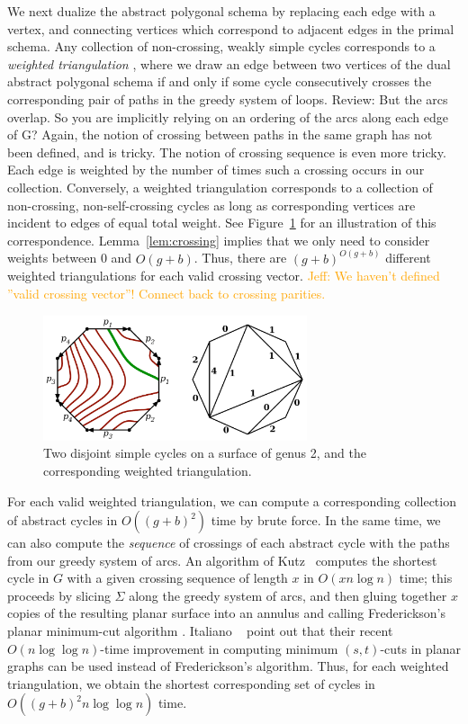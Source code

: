 \documentclass[letterpaper,review]{siamart190516}
\def\rnote#1{\color{red}Review: #1 \color{black}}
\def\jnote#1{\textcolor{orange}{Jeff: #1}}
\begin{document}
We next dualize the abstract polygonal schema by replacing each edge with a vertex, and connecting vertices which correspond to adjacent edges in the primal schema.  Any collection of non-crossing, weakly simple cycles corresponds to a \emph{weighted triangulation} \cite{ccelw-scsih-08}, where we draw an edge between two vertices of the dual abstract polygonal schema if and only if some cycle consecutively crosses the corresponding pair of paths in the greedy system of loops.  
\rnote{
But the arcs overlap. So you are implicitly relying on an ordering of the arcs along each edge of G? Again, the notion of crossing between paths in the same graph has not been defined, and is tricky. The notion of crossing sequence is even more tricky.
}
Each edge is weighted by the number of times such a crossing occurs in our collection.  Conversely, a weighted triangulation corresponds to a collection of non-crossing, non-self-crossing cycles as long as corresponding vertices are incident to edges of equal total weight.  See Figure~\ref{fig:weightedtriangulation} for an illustration of this correspondence.  Lemma~\ref{lem:crossing} implies that we only need to consider weights between 0 and $O(g+b)$.  Thus, there are $(g+b)^{O(g+b)}$ different weighted triangulations for each valid crossing vector.  \jnote{We haven’t defined ”valid crossing vector”!  Connect back to crossing parities.}


\begin{figure}[htb]
\centering\includegraphics[height=1.45in]{Fig/triangulation}
\caption{Two disjoint simple cycles on a surface of genus 2, and the corresponding weighted triangulation.}
\label{fig:weightedtriangulation}
\end{figure}

For each valid weighted triangulation, we can compute a corresponding collection of abstract cycles in $O((g+b)^2)$ time by brute force.  In the same time, we can also compute the \emph{sequence} of crossings of each abstract cycle with the paths from our greedy system of arcs.  An algorithm of Kutz~\cite{k-csnco-06} computes the shortest cycle in $G$ with a given crossing sequence of length $x$ in $O(x n \log n)$ time; this proceeds by slicing $\Sigma$ along the greedy system of arcs, and then gluing together $x$ copies of the resulting planar surface into an annulus and calling Frederickson's planar minimum-cut algorithm \cite{f-faspp-87}.
Italiano \etal~\cite{insw-iamcmf-11} point out that their recent $O(n \log \log n)$-time improvement in computing minimum $(s,t)$-cuts in planar graphs can be used instead of Frederickson's algorithm. 
Thus, for each weighted triangulation, we obtain the shortest corresponding set of cycles in $O((g+b)^2 n \log \log n)$ time.
\end{document}
